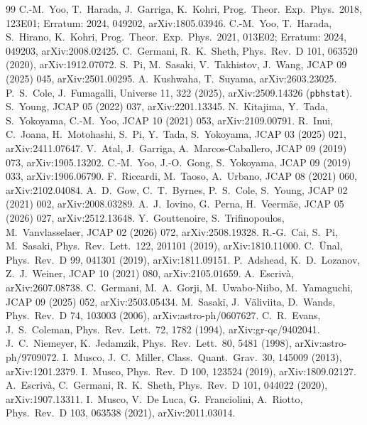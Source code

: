 \documentclass[11pt,a4paper]{article}
\begin{document}
\begin{thebibliography}{99}
 C.-M.~Yoo, T.~Harada, J.~Garriga, K.~Kohri, Prog.\ Theor.\ Exp.\ Phys.\ 2018, 123E01; Erratum: 2024, 049202, arXiv:1805.03946.
 C.-M.~Yoo, T.~Harada, S.~Hirano, K.~Kohri, Prog.\ Theor.\ Exp.\ Phys.\ 2021, 013E02; Erratum: 2024, 049203, arXiv:2008.02425.
 C.~Germani, R.~K.~Sheth, Phys.\ Rev.\ D 101, 063520 (2020), arXiv:1912.07072.
 S.~Pi, M.~Sasaki, V.~Takhistov, J.~Wang, JCAP 09 (2025) 045, arXiv:2501.00295.
 A.~Kushwaha, T.~Suyama, arXiv:2603.23025.
 P.~S.~Cole, J.~Fumagalli, Universe 11, 322 (2025), arXiv:2509.14326 (\texttt{pbhstat}).
 S.~Young, JCAP 05 (2022) 037, arXiv:2201.13345.
 N.~Kitajima, Y.~Tada, S.~Yokoyama, C.-M.~Yoo, JCAP 10 (2021) 053, arXiv:2109.00791.
 R.~Inui, C.~Joana, H.~Motohashi, S.~Pi, Y.~Tada, S.~Yokoyama, JCAP 03 (2025) 021, arXiv:2411.07647.
 V.~Atal, J.~Garriga, A.~Marcos-Caballero, JCAP 09 (2019) 073, arXiv:1905.13202.
 C.-M.~Yoo, J.-O.~Gong, S.~Yokoyama, JCAP 09 (2019) 033, arXiv:1906.06790.
 F.~Riccardi, M.~Taoso, A.~Urbano, JCAP 08 (2021) 060, arXiv:2102.04084.
 A.~D.~Gow, C.~T.~Byrnes, P.~S.~Cole, S.~Young, JCAP 02 (2021) 002, arXiv:2008.03289.
 A.~J.~Iovino, G.~Perna, H.~Veerm\"ae, JCAP 05 (2026) 027, arXiv:2512.13648.
 Y.~Gouttenoire, S.~Trifinopoulos, M.~Vanvlasselaer, JCAP 02 (2026) 072, arXiv:2508.19328.
 R.-G.~Cai, S.~Pi, M.~Sasaki, Phys.\ Rev.\ Lett.\ 122, 201101 (2019), arXiv:1810.11000.
 C.~\"Unal, Phys.\ Rev.\ D 99, 041301 (2019), arXiv:1811.09151.
 P.~Adshead, K.~D.~Lozanov, Z.~J.~Weiner, JCAP 10 (2021) 080, arXiv:2105.01659.
 A.~Escriv\`a, arXiv:2607.08738.
 C.~Germani, M.~A.~Gorji, M.~Uwabo-Niibo, M.~Yamaguchi, JCAP 09 (2025) 052, arXiv:2503.05434.
 M.~Sasaki, J.~V\"aliviita, D.~Wands, Phys.\ Rev.\ D 74, 103003 (2006), arXiv:astro-ph/0607627.
 C.~R.~Evans, J.~S.~Coleman, Phys.\ Rev.\ Lett.\ 72, 1782 (1994), arXiv:gr-qc/9402041.
 J.~C.~Niemeyer, K.~Jedamzik, Phys.\ Rev.\ Lett.\ 80, 5481 (1998), arXiv:astro-ph/9709072.
 I.~Musco, J.~C.~Miller, Class.\ Quant.\ Grav.\ 30, 145009 (2013), arXiv:1201.2379.
 I.~Musco, Phys.\ Rev.\ D 100, 123524 (2019), arXiv:1809.02127.
 A.~Escriv\`a, C.~Germani, R.~K.~Sheth, Phys.\ Rev.\ D 101, 044022 (2020), arXiv:1907.13311.
 I.~Musco, V.~De Luca, G.~Franciolini, A.~Riotto, Phys.\ Rev.\ D 103, 063538 (2021), arXiv:2011.03014.

\end{thebibliography}
\end{document}
